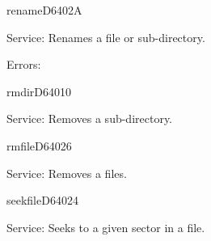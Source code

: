 \newpage
\begin{hyppotrap}{rename}{D640}{2A}
\item [Service:]
  Renames a file or sub-directory.
\item [Errors:]
\notimplemented
\end{hyppotrap}


\begin{hyppotrap}{rmdir}{D640}{10}
\item [Service:]
  Removes a sub-directory.
\notimplemented
\end{hyppotrap}


\begin{hyppotrap}{rmfile}{D640}{26}
\item [Service:]
  Removes a files.
\notimplemented
\end{hyppotrap}


\begin{hyppotrap}{seekfile}{D640}{24}
\item [Service:]
  Seeks to a given sector in a file.
\notimplemented
\end{hyppotrap}


